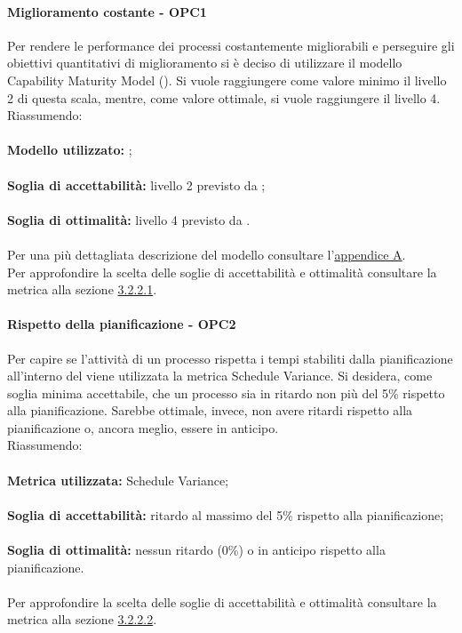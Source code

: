 \documentclass[PianoDiQualifica.tex]{subfiles}
\begin{document}
			\paragraph{Miglioramento costante - OPC1}
			Per rendere le performance dei processi costantemente migliorabili e perseguire gli obiettivi quantitativi di miglioramento si è deciso di utilizzare il modello Capability Maturity Model ().
			Si vuole raggiungere come valore minimo il livello 2 di questa scala, mentre, come valore ottimale, si vuole raggiungere il livello 4. \\
			Riassumendo: \\ \\
			\textbf{Modello utilizzato:} ; \\ \\
			\textbf{Soglia di accettabilità:} livello 2 previsto da ; \\ \\
			\textbf{Soglia di ottimalità:} livello 4 previsto da . \\ \\
			Per una più dettagliata descrizione del modello  consultare l'\hyperlink{CMM_label}{appendice A}. \\
			Per approfondire la scelta delle soglie di accettabilità e ottimalità consultare la metrica alla sezione \hyperlink{CMM_m}{3.2.2.1}.	
			
			\paragraph{Rispetto della pianificazione - OPC2}
			Per capire se l'attività di un processo rispetta i tempi stabiliti dalla pianificazione all'interno del \PPdocRR{} viene utilizzata la metrica Schedule Variance.
			Si desidera, come soglia minima accettabile, che un processo sia in ritardo non più del 5\% rispetto alla pianificazione. Sarebbe ottimale, invece, non avere ritardi
			rispetto alla pianificazione o, ancora meglio, essere in anticipo.\\
			Riassumendo: \\ \\
			\textbf{Metrica utilizzata:} Schedule Variance; \\ \\
			\textbf{Soglia di accettabilità:} ritardo al massimo del 5\% rispetto alla pianificazione; \\ \\
			\textbf{Soglia di ottimalità:} nessun ritardo (0\%) o in anticipo rispetto alla pianificazione. \\ \\
			Per approfondire la scelta delle soglie di accettabilità e ottimalità consultare la metrica alla sezione \hyperlink{Schedule_m}{3.2.2.2}.	
			
\end{document}
